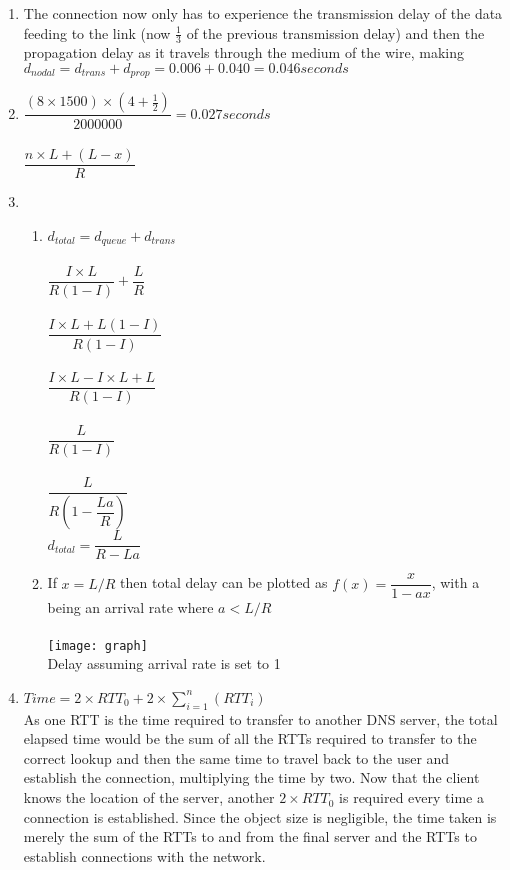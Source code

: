 \documentclass[12pt]{article}
\begin{document}
\begin{enumerate}
	\item The connection now only has to experience the transmission delay of the data feeding to the link (now $\frac{1}{3}$ of the previous transmission delay) and then the propagation delay as it travels through the medium of the wire, making $d_{nodal} = d_{trans} + d_{prop} = 0.006 + 0.040 = 0.046seconds$

	\item $\dfrac{(8\times 1500)\times (4 + \frac{1}{2})}{2000000} = 0.027seconds$\\
		\\
		$\dfrac{n\times L + (L-x)}{R}$

	\item \begin{enumerate}
			\item $d_{total} = d_{queue} + d_{trans}$\\
				\\
				$\dfrac{I\times L}{R(1 - I)} + \dfrac{L}{R}$\\
				\\
				$\dfrac{I\times L + L(1 - I)}{R(1 - I)}$\\
				\\
				$\dfrac{I\times L - I\times L + L}{R(1 - I)}$\\
				\\
				$\dfrac{L}{R(1 - I)}$\\
				\\
				$\dfrac{L}{R(1 - \dfrac{L a}{R})}$\\
				$d_{total} = \dfrac{L}{R - L a}$\\
			\item If $x = L/R$ then total delay can be plotted as $f(x) = \dfrac{x}{1 - ax}$, with a being an arrival rate where $a < L/R$\\
			\\
			\texttt{[image: graph]}\\
			Delay assuming arrival rate is set to 1
		\end{enumerate}

	\item $Time = 2 \times RTT_0 + 2\times\sum\limits_{i = 1}^{n}(RTT_i)$\\
		As one RTT is the time required to transfer to another DNS server, the total elapsed time would be the sum of all the RTTs required to transfer to the correct lookup and then the same time to travel back to the user and establish the connection, multiplying the time by two. Now that the client knows the location of the server, another $2\times RTT_0$ is required every time a connection is established. Since the object size is negligible, the time taken is merely the sum of the RTTs to and from the final server and the RTTs to establish connections with the network.


\end{enumerate}
\end{document}

